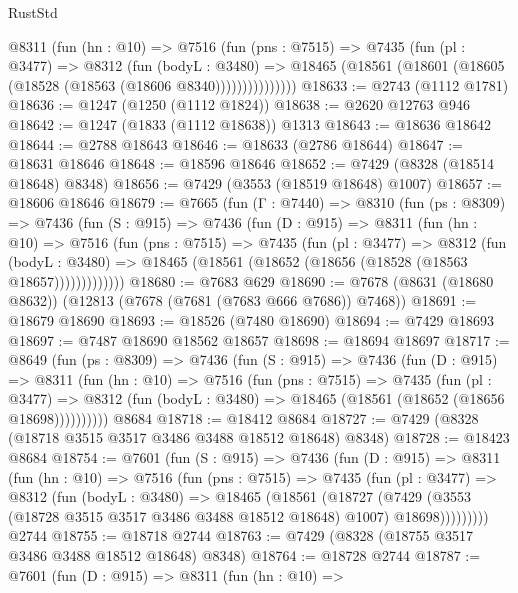 \begin{lexlean}{RustStd}
\begin{coremodule}
            @8311
              (fun (hn : @10) =>
              @7516
                (fun (pns : @7515) =>
                @7435
                  (fun (pl : @3477) =>
                  @8312
                    (fun (bodyL : @3480) =>
                    @18465 (@18561 (@18601 (@18605 (@18528 (@18563 (@18606 @8340)))))))))))))))
@18633 := @2743 (@1112 @1781)
@18636 := @1247 (@1250 (@1112 @1824))
@18638 := @2620 @12763 @946
@18642 := @1247 (@1833 (@1112 @18638)) @1313
@18643 := @18636 @18642
@18644 := @2788 @18643
@18646 := @18633 (@2786 @18644)
@18647 := @18631 @18646
@18648 := @18596 @18646
@18652 := @7429 (@8328 (@18514 @18648) @8348)
@18656 := @7429 (@3553 (@18519 @18648) @1007)
@18657 := @18606 @18646
@18679 := @7665
    (fun (Γ : @7440) =>
    @8310
      (fun (ps : @8309) =>
      @7436
        (fun (S : @915) =>
        @7436
          (fun (D : @915) =>
          @8311
            (fun (hn : @10) =>
            @7516
              (fun (pns : @7515) =>
              @7435
                (fun (pl : @3477) =>
                @8312
                  (fun (bodyL : @3480) =>
                  @18465 (@18561 (@18652 (@18656 (@18528 (@18563 @18657)))))))))))))
@18680 := @7683 @629
@18690 := @7678 (@8631 (@18680 @8632)) (@12813 (@7678 (@7681 (@7683 @666 @7686)) @7468))
@18691 := @18679 @18690
@18693 := @18526 (@7480 @18690)
@18694 := @7429 @18693
@18697 := @7487 @18690 @18562 @18657
@18698 := @18694 @18697
@18717 := @8649
    (fun (ps : @8309) =>
    @7436
      (fun (S : @915) =>
      @7436
        (fun (D : @915) =>
        @8311
          (fun (hn : @10) =>
          @7516
            (fun (pns : @7515) =>
            @7435
              (fun (pl : @3477) =>
              @8312 (fun (bodyL : @3480) => @18465 (@18561 (@18652 (@18656 @18698))))))))))
    @8684
@18718 := @18412 @8684
@18727 := @7429 (@8328 (@18718 @3515 @3517 @3486 @3488 @18512 @18648) @8348)
@18728 := @18423 @8684
@18754 := @7601
    (fun (S : @915) =>
    @7436
      (fun (D : @915) =>
      @8311
        (fun (hn : @10) =>
        @7516
          (fun (pns : @7515) =>
          @7435
            (fun (pl : @3477) =>
            @8312
              (fun (bodyL : @3480) =>
              @18465
                (@18561
                  (@18727
                    (@7429
                      (@3553 (@18728 @3515 @3517 @3486 @3488 @18512 @18648) @1007)
                      @18698)))))))))
    @2744
@18755 := @18718 @2744
@18763 := @7429 (@8328 (@18755 @3517 @3486 @3488 @18512 @18648) @8348)
@18764 := @18728 @2744
@18787 := @7601
    (fun (D : @915) =>
    @8311
      (fun (hn : @10) =>

\end{coremodule}
\end{lexlean}
